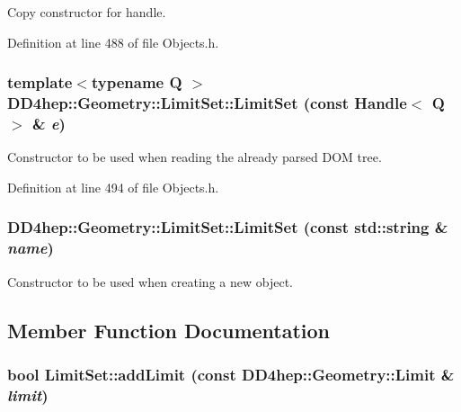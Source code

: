 Copy constructor for handle. 

Definition at line 488 of file Objects.h.\hypertarget{class_d_d4hep_1_1_geometry_1_1_limit_set_ab8897a481b04196ff0f1d188b7f2fcf2}{
\subsubsection[{LimitSet}]{\setlength{\rightskip}{0pt plus 5cm}template$<$typename Q $>$ DD4hep::Geometry::LimitSet::LimitSet (const {\bf Handle}$<$ Q $>$ \& {\em e})}}
\label{class_d_d4hep_1_1_geometry_1_1_limit_set_ab8897a481b04196ff0f1d188b7f2fcf2}


Constructor to be used when reading the already parsed DOM tree. 

Definition at line 494 of file Objects.h.\hypertarget{class_d_d4hep_1_1_geometry_1_1_limit_set_ab60ed00860a4026b6697aef637cf61ee}{
\subsubsection[{LimitSet}]{\setlength{\rightskip}{0pt plus 5cm}DD4hep::Geometry::LimitSet::LimitSet (const std::string \& {\em name})}}
\label{class_d_d4hep_1_1_geometry_1_1_limit_set_ab60ed00860a4026b6697aef637cf61ee}


Constructor to be used when creating a new object. 

\subsection{Member Function Documentation}
\hypertarget{class_d_d4hep_1_1_geometry_1_1_limit_set_a7cbdab17081174e9a0d1d8ce71246700}{
\subsubsection[{addLimit}]{\setlength{\rightskip}{0pt plus 5cm}bool LimitSet::addLimit (const {\bf DD4hep::Geometry::Limit} \& {\em limit})}}
\label{class_d_d4hep_1_1_geometry_1_1_limit_set_a7cbdab17081174e9a0d1d8ce71246700}


